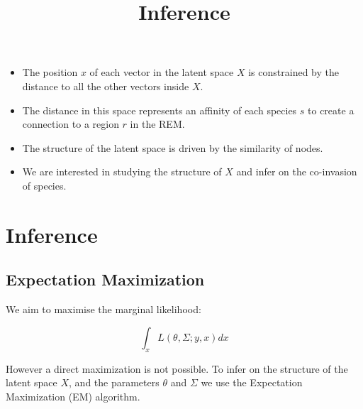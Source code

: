 \documentclass[
	11pt, %
]{beamer}
\begin{document}
\begin{frame}

\begin{itemize}
\item The position $x$ of each vector in the latent space $X$ is constrained by the distance to all the other vectors inside $X$.
\item The distance in this space represents an affinity of each species $s$ to create a connection to a region $r$ in the REM.
\item The structure of the latent space is driven by the similarity of nodes.
\item We are interested in studying the structure of $X$ and infer on the co-invasion of species.
\end{itemize}


\end{frame}

\section{Inference}

\subsection{Expectation Maximization}
\begin{frame}
\title{Inference}

We aim to maximise the marginal likelihood: 

$$\int_x L(\theta, \Sigma ; y, x) dx$$

\bigskip

However a direct maximization is not possible. To infer on the structure of the latent space $X$, and the parameters $\theta$  and $\Sigma$ we use the Expectation Maximization (EM) algorithm. 
\bigskip

\begin{algorithm}[H]
\end{algorithm}


\end{frame}
\end{document}
